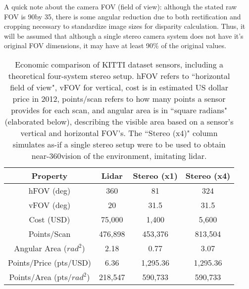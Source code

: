 A quick note about the camera FOV (field of view): although the stated raw FOV is 90\deg by 35\deg, there is some angular reduction due to both rectification and cropping necessary to standardize image sizes for disparity calculation. Thus, it will be assumed that although a single stereo camera system does not have it's original FOV dimensions, it may have at least 90\% of the original values. 

\def \b #1{\textbf{#1}} 
\begin{table}[h]
	\centering
	\caption{Economic comparison of KITTI dataset sensors, including a theoretical four-system stereo setup. hFOV refers to ``horizontal field of view", vFOV for vertical, cost is in estimated US dollar price in 2012, points/scan refers to how many points a sensor provides for each scan, and angular area is in ``square radians" (elaborated below), describing the visible area based on a sensor's vertical and horizontal FOV's. The ``Stereo (x4)" column simulates as-if a single stereo setup were to be used to obtain near-360\deg vision of the environment, imitating lidar.}
	\begin{tabular}{|c|c|c|c|}
	\hline
	\b{Property}              & \b{Lidar} & \b{Stereo (x1)} & \b{Stereo (x4)} \\ \hline
	hFOV (deg)                & 360       & 81              & 324      \\\hline
	vFOV (deg)                & 20        & 31.5            & 31.5     \\\hline
	Cost (USD)                & 75,000    & 1,400           & 5,600    \\\hline
	Points/Scan               & 476,898   & 453,376         & 813,504  \\\hline
	Angular Area ($rad^2$)    & 2.18      & 0.77            & 3.07     \\\hline
	Points/Price (pts/USD)    & 6.36      & 1,295.36        & 1,295.36 \\\hline
	Points/Area (pts/$rad^2$) & 218,547   & 590,733         & 590,733  \\\hline
	\end{tabular}
\end{table}



